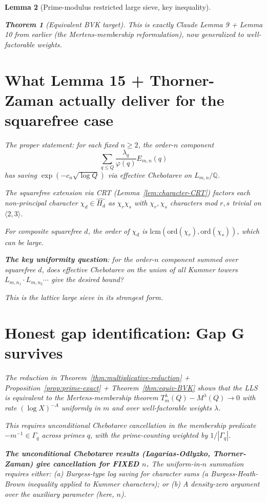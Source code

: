 \documentclass[11pt]{article}
\newtheorem{theorem}{Theorem}[section]
\newtheorem{lemma}[theorem]{Lemma}
\newcommand{\Q}{\mathbb Q}
\begin{document}
\begin{lemma}[Prime-modulus restricted large sieve, key inequality]
\begin{theorem}[Equivalent BVK target]
This is exactly Claude Lemma 9 + Lemma 10 from earlier (the Mertens-membership reformulation), now generalized to well-factorable weights.

\section{What Lemma 15 + Thorner-Zaman actually deliver for the squarefree case}

The proper statement: for each fixed $n \geq 2$, the order-$n$ component
\[
\sum_{q \leq Q} \frac{\lambda_q}{\varphi(q)} E_{m,n}(q)
\]
has saving $\exp(-c_n \sqrt{\log Q})$ via effective Chebotarev on $L_{m,n}/\Q$.

The squarefree extension via CRT (Lemma~\ref{lem:character-CRT}) factors each non-principal character $\chi_d \in \widehat{H_d}$ as $\chi_r \chi_s$ with $\chi_r, \chi_s$ characters mod $r, s$ trivial on $\langle 2, 3\rangle$.

For composite squarefree $d$, the order of $\chi_d$ is $\text{lcm}(\text{ord}(\chi_r), \text{ord}(\chi_s))$, which can be large.

\textbf{The key uniformity question}: for the order-$n$ component summed over squarefree $d$, does effective Chebotarev on the union of all Kummer towers $L_{m,n_1} \cdot L_{m,n_2} \cdots$ give the desired bound?

This is the lattice large sieve in its strongest form.

\section{Honest gap identification: Gap G survives}

The reduction in Theorem~\ref{thm:multiplicative-reduction} + Proposition~\ref{prop:prime-exact} + Theorem~\ref{thm:equiv-BVK} shows that the LLS is equivalent to the Mertens-membership theorem $T_m^\lambda(Q) - M^\lambda(Q) \to 0$ with rate $(\log X)^{-A}$ uniformly in $m$ and over well-factorable weights $\lambda$.

This requires unconditional Chebotarev cancellation in the membership predicate $-m^{-1} \in \Gamma_q$ across primes $q$, with the prime-counting weighted by $1/|\Gamma_q|$.

\textbf{The unconditional Chebotarev results (Lagarias-Odlyzko, Thorner-Zaman) give cancellation for FIXED $n$.} The uniform-in-$n$ summation requires either:
(a) Burgess-type log saving for character sums (a Burgess-Heath-Brown inequality applied to Kummer characters); or
(b) A density-zero argument over the auxiliary parameter (here, $n$).


\end{theorem}
\end{lemma}
\end{document}
